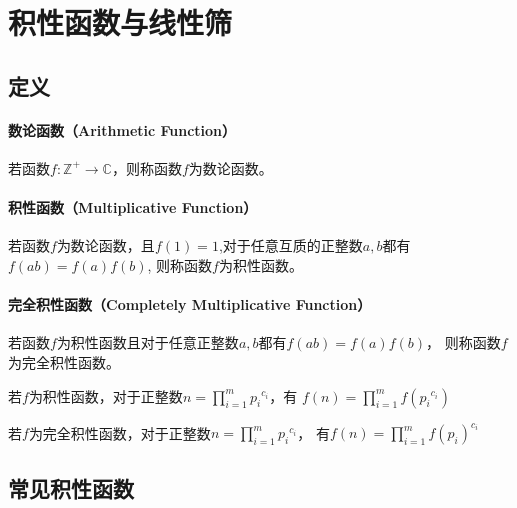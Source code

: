 \section{积性函数与线性筛}
\subsection{定义}
\paragraph{数论函数（Arithmetic Function）}
若函数$f:\mathbb{Z^+}\rightarrow\mathbb{C}$，则称函数$f$为数论函数。

\paragraph{积性函数（Multiplicative Function）}
若函数$f$为数论函数，且$f(1)=1$,对于任意互质的正整数$a,b$都有$f(ab)=f(a)f(b)$,
则称函数$f$为积性函数。

\paragraph{完全积性函数（Completely Multiplicative Function）}
若函数$f$为积性函数且对于任意正整数$a,b$都有$f(ab)=f(a)f(b)$，
则称函数$f$为完全积性函数。
\begin{property}\label{MFC}
	若$f$为积性函数，对于正整数$\displaystyle n=\prod_{i=1}^m{{p_i}^{c_i}}$，有
	$\displaystyle f(n)=\prod_{i=1}^m{f({p_i}^{c_i})}$
\end{property}
\begin{property}
	若$f$为完全积性函数，对于正整数$\displaystyle n=\prod_{i=1}^m{{p_i}^{c_i}}$，
	有$\displaystyle f(n)=\prod_{i=1}^m{f(p_i)^{c_i}}$
\end{property}
\subsection{常见积性函数}
